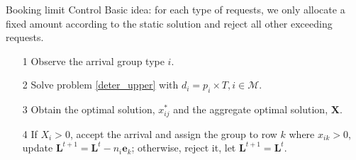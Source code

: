       \begin{frame}{Booking limit Control}
        Basic idea: for each type of requests, we only allocate a fixed amount according to the static solution and reject all other exceeding requests.
        \begin{itemize}
          \item[1] Observe the arrival group type $i$.
          \item[2] Solve problem \eqref{deter_upper} with $d_{i} = p_{i} \times T, i \in \mathcal{M}$.
          \item[3] Obtain the optimal solution, $x_{ij}^{*}$ and the aggregate optimal solution, $\mathbf{X}$.
          \item[4] If $X_{i} > 0$, accept the arrival and assign the group to row $k$ where $x_{ik} > 0$, update $\mathbf{L}^{t+1} = \mathbf{L}^{t} - n_i \mathbf{e}_{k}$; otherwise, reject it, let $\mathbf{L}^{t+1} = \mathbf{L}^{t}$.
        \end{itemize}
                 
      \end{frame}
      